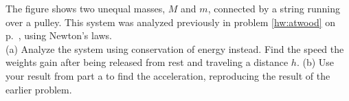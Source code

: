         The figure shows two unequal masses, $M$ and $m$, connected by
        a string running over a pulley. This system was analyzed previously
        in problem \ref{hw:atwood} on p.~\pageref{hw:atwood}, using Newton's
laws.\\ (a) Analyze the system using conservation of energy instead. Find the
speed the weights gain after being released from rest and traveling a distance
$h$.\answercheck\hwendpart
(b) Use your result from part a to find the acceleration, reproducing the
result of the earlier problem.\answercheck\hwendpart
